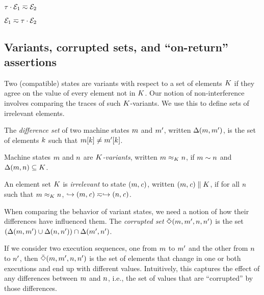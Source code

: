 \documentclass[10pt,conference]{ieeetran}%
\theoremstyle{definition}
\begin{document}
\begin{minipage}{.4\columnwidth}
           {\(\tau \cdot \mathcal{E}_1 \eqsim \mathcal{E}_2\)}
\end{minipage}
\begin{minipage}{.4\columnwidth}
           {\(\mathcal{E}_1 \eqsim \tau \cdot \mathcal{E}_2\)}
\end{minipage}

\subsection{Variants, corrupted sets, and ``on-return'' assertions}
\label{sec:props}

Two (compatible) states are variants with respect to a set of elements \(K\)
if they agree on the value of every element not in \(K\).
Our notion of non-interference involves comparing the traces of such
\(K\)-variants. We use this to define sets of irrelevant elements.

 The \emph{difference set} of two machine states \(m\) and \(m'\),
written \(\Delta(m,m')\),
is the set of elements \(k\) such that \(m[k] \not = m'[k]\).

 Machine states \(m\) and \(n\) are {\em \(K\)-variants},
written \(m \approx_K n\), if \(m\sim n\) and
\(\Delta(m,n) \subseteq K\).

 An element set \(K\) is \emph{irrelevant} to state \((m,\mathit{c})\),
written \((m,\mathit{c}) \parallel K\), if for all
\(n\) such that \(m \approx_{K} n\),
\(\hookrightarrow (m,\mathit{c})  \eqsim \hookrightarrow (n,\mathit{c})\).


When comparing the behavior of variant states, we need a notion of how their
differences have influenced them.
 The {\em corrupted set} \(\bar{\Diamond}(m,m',n,n')\)
is the set \((\Delta(m,m') \cup \Delta(n,n')) \cap \Delta(m',n')\).

If we consider two execution sequences, one from \(m\) to \(m'\)
and the other from \(n\) to \(n'\),
then \(\bar{\Diamond}(m,m',n,n')\) is the set of elements that
change in one or both executions and end up with different values. Intuitively,
this captures the effect of any differences between \(m\) and \(n\), i.e.,
the set of values that are ``corrupted'' by those differences.
\end{document}
